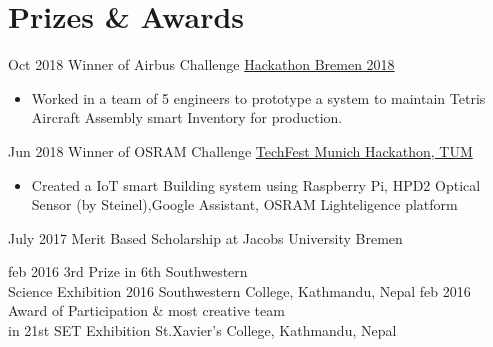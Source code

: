 \documentclass[letterpaper]{twentysecondcv} %
\begin{document}
\section{Prizes \& Awards}
\begin{twenty}
    \twentyitem
         {Oct 2018}
        {}
        {Winner of Airbus Challenge}
        {\href{https://www.hackathon-bremen.de}{Hackathon Bremen 2018}}
        {}
        {
        {\begin{itemize}
        \item Worked in a team of 5 engineers to prototype a system to maintain Tetris Aircraft Assembly smart Inventory for production. \\ 
         
        \end{itemize}}
        }
        
    \twentyitem
        {Jun 2018}
        {}
        {Winner of OSRAM Challenge}
        {\href{https://www.techfestmunich.com/2018}{TechFest Munich Hackathon, TUM}}
        {}
        {
        {\begin{itemize}
        \item Created a IoT smart Building system using Raspberry Pi, HPD2 Optical Sensor (by Steinel),Google Assistant, OSRAM Lighteligence platform\\
         
        \end{itemize}}
        }
        
     \twentyitem
        {July 2017}
        {}
        {Merit Based Scholarship at Jacobs University Bremen}
        {}
        {}
        {
        }
        
    \twentyitem
        {feb 2016}
        {}
        {3rd Prize in 6th Southwestern \\Science Exhibition 2016 }
        {Southwestern College, Kathmandu, Nepal}
        {}
        {
        }
     \twentyitem
        {feb 2016}
        {}
        {Award of Participation \& most creative team\\ in 21st SET Exhibition}
        {St.Xavier's College, Kathmandu, Nepal}
        {}
        {
        }
        \begin{comment}
        \twentyitem
        {feb 2016}
        {}
        {Letter of Appreciation in 5th Trinity\\ Sci-Tech Exhibition}
        {Trinity Intl' College, Kathmandu, Nepal}
        {}
        {
        }
        \end{comment}
\end{twenty}
\end{document}
